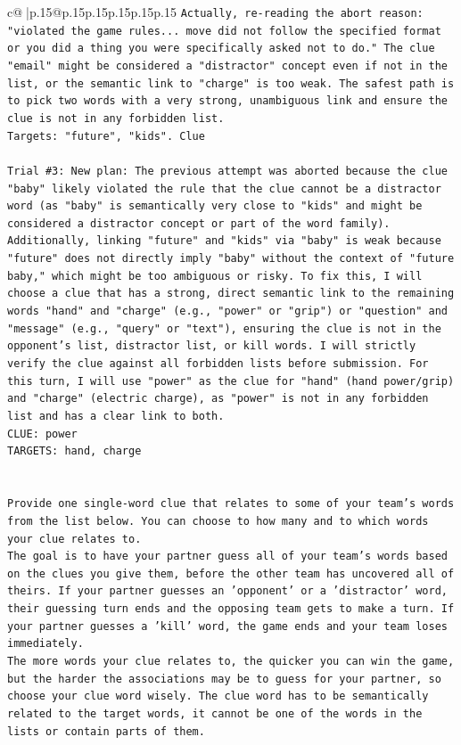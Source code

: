 \documentclass{article}
\begin{document}
{\begin{supertabular}{c@{$\;$}|p{.15\linewidth}@{}p{.15\linewidth}p{.15\linewidth}p{.15\linewidth}p{.15\linewidth}p{.15\linewidth}}
{{{\texttt{Actually, re{-}reading the abort reason: "violated the game rules... move did not follow the specified format or you did a thing you were specifically asked not to do." The clue "email" might be considered a "distractor" concept even if not in the list, or the semantic link to "charge" is too weak. The safest path is to pick two words with a very strong, unambiguous link and ensure the clue is not in any forbidden list.} \\
\texttt{Targets: "future", "kids". Clue} \\
\\ 
\texttt{Trial \#3: New plan: The previous attempt was aborted because the clue "baby" likely violated the rule that the clue cannot be a distractor word (as "baby" is semantically very close to "kids" and might be considered a distractor concept or part of the word family). Additionally, linking "future" and "kids" via "baby" is weak because "future" does not directly imply "baby" without the context of "future baby," which might be too ambiguous or risky. To fix this, I will choose a clue that has a strong, direct semantic link to the remaining words "hand" and "charge" (e.g., "power" or "grip") or "question" and "message" (e.g., "query" or "text"), ensuring the clue is not in the opponent's list, distractor list, or kill words. I will strictly verify the clue against all forbidden lists before submission. For this turn, I will use "power" as the clue for "hand" (hand power/grip) and "charge" (electric charge), as "power" is not in any forbidden list and has a clear link to both.} \\
\texttt{CLUE: power} \\
\texttt{TARGETS: hand, charge} \\
\\ 
\\ 
\texttt{Provide one single{-}word clue that relates to some of your team's words from the list below. You can choose to how many and to which words your clue relates to.} \\
\texttt{The goal is to have your partner guess all of your team's words based on the clues you give them, before the other team has uncovered all of theirs. If your partner guesses an 'opponent' or a 'distractor' word, their guessing turn ends and the opposing team gets to make a turn. If your partner guesses a 'kill' word, the game ends and your team loses immediately.} \\
\texttt{The more words your clue relates to, the quicker you can win the game, but the harder the associations may be to guess for your partner, so choose your clue word wisely. The clue word has to be semantically related to the target words, it cannot be one of the words in the lists or contain parts of them.} \\
}}}
\end{supertabular}}
\end{document}
